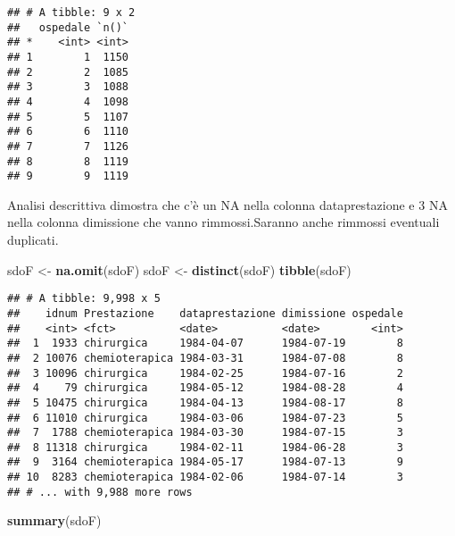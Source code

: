 \documentclass[]{article}
\newenvironment{Shaded}{\begin{snugshade}}{\end{snugshade}}
\newcommand{\KeywordTok}[1]{\textcolor[rgb]{0.13,0.29,0.53}{\textbf{#1}}}
\newcommand{\NormalTok}[1]{#1}
\newcommand{\OperatorTok}[1]{\textcolor[rgb]{0.81,0.36,0.00}{\textbf{#1}}}
\newcommand{\StringTok}[1]{\textcolor[rgb]{0.31,0.60,0.02}{#1}}
\begin{document}
\begin{Shaded}
\end{Shaded}

\begin{verbatim}
## # A tibble: 9 x 2
##   ospedale `n()`
## *    <int> <int>
## 1        1  1150
## 2        2  1085
## 3        3  1088
## 4        4  1098
## 5        5  1107
## 6        6  1110
## 7        7  1126
## 8        8  1119
## 9        9  1119
\end{verbatim}

Analisi descrittiva dimostra che c'è un NA nella colonna dataprestazione
e 3 NA nella colonna dimissione che vanno rimmossi.Saranno anche
rimmossi eventuali duplicati.

\begin{Shaded}
\begin{Highlighting}[]
\NormalTok{sdoF <-}\StringTok{ }\KeywordTok{na.omit}\NormalTok{(sdoF)}
\NormalTok{sdoF <-}\StringTok{ }\KeywordTok{distinct}\NormalTok{(sdoF)}
\KeywordTok{tibble}\NormalTok{(sdoF)}
\end{Highlighting}
\end{Shaded}

\begin{verbatim}
## # A tibble: 9,998 x 5
##    idnum Prestazione    dataprestazione dimissione ospedale
##    <int> <fct>          <date>          <date>        <int>
##  1  1933 chirurgica     1984-04-07      1984-07-19        8
##  2 10076 chemioterapica 1984-03-31      1984-07-08        8
##  3 10096 chirurgica     1984-02-25      1984-07-16        2
##  4    79 chirurgica     1984-05-12      1984-08-28        4
##  5 10475 chirurgica     1984-04-13      1984-08-17        8
##  6 11010 chirurgica     1984-03-06      1984-07-23        5
##  7  1788 chemioterapica 1984-03-30      1984-07-15        3
##  8 11318 chirurgica     1984-02-11      1984-06-28        3
##  9  3164 chemioterapica 1984-05-17      1984-07-13        9
## 10  8283 chemioterapica 1984-02-06      1984-07-14        3
## # ... with 9,988 more rows
\end{verbatim}

\begin{Shaded}
\begin{Highlighting}[]
\KeywordTok{summary}\NormalTok{(sdoF)}
\end{Highlighting}
\end{Shaded}
\end{document}
